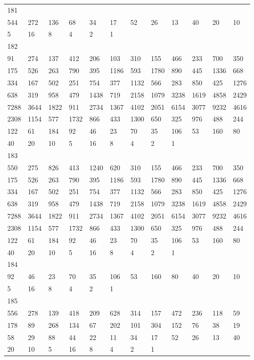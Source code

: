 \begin{longtable}{llllllllllll}
181&&&&&&&&&&&\\
544& 272& 136& 68& 34& 17& 52& 26& 13& 40& 20& 10\\
5& 16& 8& 4& 2& 1& \\

182&&&&&&&&&&&\\
91& 274& 137& 412& 206& 103& 310& 155& 466& 233& 700& 350\\
175& 526& 263& 790& 395& 1186& 593& 1780& 890& 445& 1336& 668\\
334& 167& 502& 251& 754& 377& 1132& 566& 283& 850& 425& 1276\\
638& 319& 958& 479& 1438& 719& 2158& 1079& 3238& 1619& 4858& 2429\\
7288& 3644& 1822& 911& 2734& 1367& 4102& 2051& 6154& 3077& 9232& 4616\\
2308& 1154& 577& 1732& 866& 433& 1300& 650& 325& 976& 488& 244\\
122& 61& 184& 92& 46& 23& 70& 35& 106& 53& 160& 80\\
40& 20& 10& 5& 16& 8& 4& 2& 1& \\

183&&&&&&&&&&&\\
550& 275& 826& 413& 1240& 620& 310& 155& 466& 233& 700& 350\\
175& 526& 263& 790& 395& 1186& 593& 1780& 890& 445& 1336& 668\\
334& 167& 502& 251& 754& 377& 1132& 566& 283& 850& 425& 1276\\
638& 319& 958& 479& 1438& 719& 2158& 1079& 3238& 1619& 4858& 2429\\
7288& 3644& 1822& 911& 2734& 1367& 4102& 2051& 6154& 3077& 9232& 4616\\
2308& 1154& 577& 1732& 866& 433& 1300& 650& 325& 976& 488& 244\\
122& 61& 184& 92& 46& 23& 70& 35& 106& 53& 160& 80\\
40& 20& 10& 5& 16& 8& 4& 2& 1& \\

184&&&&&&&&&&&\\
92& 46& 23& 70& 35& 106& 53& 160& 80& 40& 20& 10\\
5& 16& 8& 4& 2& 1& \\

185&&&&&&&&&&&\\
556& 278& 139& 418& 209& 628& 314& 157& 472& 236& 118& 59\\
178& 89& 268& 134& 67& 202& 101& 304& 152& 76& 38& 19\\
58& 29& 88& 44& 22& 11& 34& 17& 52& 26& 13& 40\\
20& 10& 5& 16& 8& 4& 2& 1& \\


\end{longtable}
